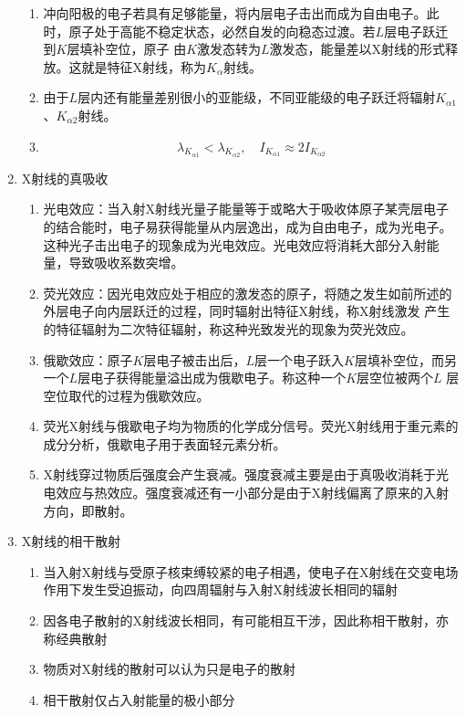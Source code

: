 \documentclass[12pt,a4paper]{article}
\begin{document}
\begin{enumerate}
\begin{enumerate}
            \item 冲向阳极的电子若具有足够能量，将内层电子击出而成为自由电子。此时，原子处于高能不稳定状态，必然自发的向稳态过渡。若$L$层电子跃迁到$K$层填补空位，原子
            由$K$激发态转为$L$激发态，能量差以X射线的形式释放。这就是特征X射线，称为$K_\alpha$射线。
            \item 由于$L$层内还有能量差别很小的亚能级，不同亚能级的电子跃迁将辐射$K_{\alpha1}$、$K_{\alpha2}$射线。
            \item $$\lambda_{K_{\alpha 1}}<\lambda_{K_{\alpha 2}}, \quad I_{K_{\alpha 1}} \approx 2 I_{K_{\alpha 2}}$$
        \end{enumerate}
        \item X射线的真吸收
        \begin{enumerate}
            \item 光电效应：当入射X射线光量子能量等于或略大于吸收体原子某壳层电子的结合能时，电子易获得能量从内层逸出，成为自由电子，成为光电子。
            这种光子击出电子的现象成为光电效应。光电效应将消耗大部分入射能量，导致吸收系数突增。
            \item 荧光效应：因光电效应处于相应的激发态的原子，将随之发生如前所述的外层电子向内层跃迁的过程，同时辐射出特征X射线，称X射线激发
            产生的特征辐射为二次特征辐射，称这种光致发光的现象为荧光效应。
            \item 俄歇效应：原子$K$层电子被击出后，$L$层一个电子跃入$K$层填补空位，而另一个$L$层电子获得能量溢出成为俄歇电子。称这种一个$K$层空位被两个$L$
            层空位取代的过程为俄歇效应。
            \item 荧光X射线与俄歇电子均为物质的化学成分信号。荧光X射线用于重元素的成分分析，俄歇电子用于表面轻元素分析。
            \item X射线穿过物质后强度会产生衰减。强度衰减主要是由于真吸收消耗于光电效应与热效应。强度衰减还有一小部分是由于X射线偏离了原来的入射方向，即散射。
        \end{enumerate}
        \item X射线的相干散射
        \begin{enumerate}
            \item 当入射X射线与受原子核束缚较紧的电子相遇，使电子在X射线在交变电场作用下发生受迫振动，向四周辐射与入射X射线波长相同的辐射
            \item 因各电子散射的X射线波长相同，有可能相互干涉，因此称相干散射，亦称经典散射
            \item 物质对X射线的散射可以认为只是电子的散射
            \item 相干散射仅占入射能量的极小部分

\end{enumerate}
\end{enumerate}
\end{document}

